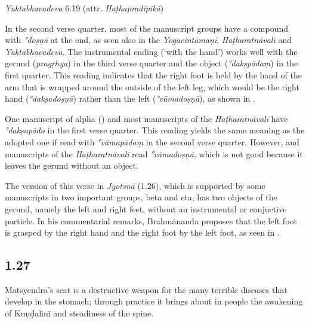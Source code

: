 \begin{ekdosis}
\begin{testimonia}[hp01_026]
\emph{Yuktabhavadeva} 6.19 (attr. \emph{Haṭhapradīpikā})

\begin{versinnote}
\end{versinnote}

\end{testimonia}

\begin{philcomm}[hp01_026]
In the second verse quarter, most of the manuscript groups have a compound with \emph{°doṣṇā} at the end, as seen also in the \emph{Yogacintāmaṇi}, \emph{Haṭharatnāvalī} and \emph{Yuktabhavadeva}. The instrumental ending (`with the hand') works well with the gerund (\emph{pragṛhya}) in the third verse quarter and the object (\emph{°dakṣpādaṃ}) in the first quarter. This reading indicates that the right foot is held by the hand of the arm that is wrapped around the outside of the left leg, which would be the right hand (\emph{°dakṣadoṣṇā}) rather than the left (\emph{°vāmadoṣṇā}), as shown in .

One manuscript of alpha () and most manuscripts of the \textit{Haṭharatnāvalī} have \emph{°dakṣapādo} in the first verse quarter. This reading yields the same meaning as the adopted one if read with \emph{°vāmapādaṃ} in the second verse quarter. However,  and manuscripts of the \textit{Haṭharatnāvalī} read \emph{°vāmadoṣṇā}, which is not good because it leaves the gerund without an object.

The version of this verse in \emph{Jyotsnā} (1.26), which is supported by some manuscripts in two important groups, beta and eta, has two objects of the gerund, namely the left and right feet, without an instrumental or conjuctive particle. In his commentarial remarks, Brahmānanda proposes that the left foot is grasped by the right hand and the right foot by the left foot, as seen in .
\end{philcomm}

\subsection*{1.27}
\begin{translation}[hp01_027]
Matsyendra's seat is a destructive weapon for the many terrible diseases that develop in the stomach; through practice it brings about in people the awakening of Kuṇḍalinī and steadiness of the spine.
\end{translation}


\end{ekdosis}
